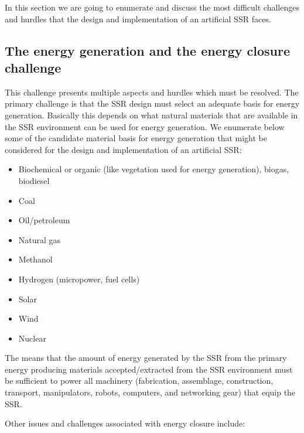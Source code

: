 In this section we are going to enumerate and discuss the most difficult
challenges and hurdles that the design and implementation of an
artificial SSR faces.

\subsection[The energy generation and the energy closure challenge]{The
energy generation and the energy closure challenge}

This challenge presents multiple
aspects and hurdles which must be resolved.  
The primary challenge is that the SSR design must select an adequate basis for energy generation.
Basically this depends on what natural materials that are available in
the SSR environment can be used for energy generation.  
We enumerate below some of the candidate material basis for energy
generation that might be considered for the design and implementation
of an artificial SSR:

\begin{itemize}
\item Biochemical or organic (like vegetation used for energy
generation), biogas, biodiesel
\item Coal
\item Oil/petroleum
\item Natural gas
\item Methanol
\item Hydrogen (micropower, fuel cells)
\item Solar
\item Wind
\item Nuclear
\end{itemize}

The  means that the amount of
energy generated by the SSR from the primary energy producing materials
accepted/extracted from the SSR environment must be sufficient to power
all machinery (fabrication, assemblage, construction, transport,
manipulators, robots, computers, and networking gear) that equip the
SSR.

Other issues and challenges associated with energy closure include:

